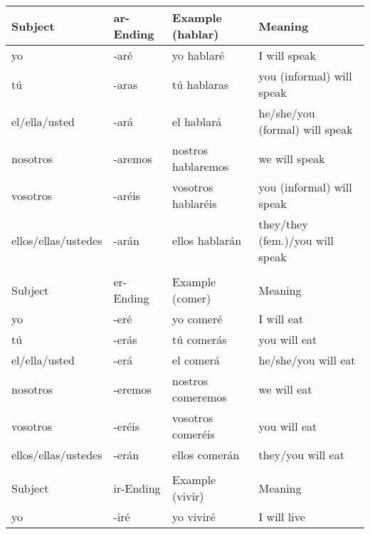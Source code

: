 \documentclass[a4paper,12pt]{article}
\begin{document}
\begin{itemize}
  \begin{table}[H]
    \centering
    \begin{tabular}{llll}
      Subject             & ar-Ending & Example (hablar)   & Meaning                         \\
      \toprule
      yo                  & -aré      & yo hablaré         & I will speak                    \\
      tú                  & -aras     & tú hablaras        & you (informal) will speak       \\
      el/ella/usted       & -ará      & el hablará         & he/she/you (formal) will speak  \\
      nosotros            & -aremos   & nostros hablaremos & we will speak                   \\
      vosotros            & -aréis    & vosotros hablaréis & you (informal) will speak       \\
      ellos/ellas/ustedes & -arán     & ellos hablarán     & they/they (fem.)/you will speak \\
      \midrule
                          &           &                    &                                 \\
      Subject             & er-Ending & Example (comer)    & Meaning                         \\
      \toprule
      yo                  & -eré      & yo comeré          & I will eat                      \\
      tú                  & -erás     & tú comerás         & you will eat                    \\
      el/ella/usted       & -erá      & el comerá          & he/she/you will eat             \\
      nosotros            & -eremos   & nostros comeremos  & we will eat                     \\
      vosotros            & -eréis    & vosotros comeréis  & you will eat                    \\
      ellos/ellas/ustedes & -erán     & ellos comerán      & they/you will eat               \\
      \midrule
                          &           &                    &                                 \\
      Subject             & ir-Ending & Example (vivir)    & Meaning                         \\
      \toprule
      yo                  & -iré      & yo viviré          & I will live                     \\

\end{tabular}
\end{table}
\end{itemize}
\end{document}
